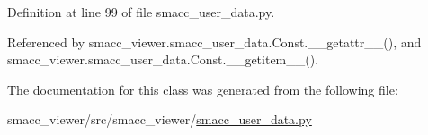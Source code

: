 Definition at line 99 of file smacc\+\_\+user\+\_\+data.\+py.



Referenced by smacc\+\_\+viewer.\+smacc\+\_\+user\+\_\+data.\+Const.\+\_\+\+\_\+getattr\+\_\+\+\_\+(), and smacc\+\_\+viewer.\+smacc\+\_\+user\+\_\+data.\+Const.\+\_\+\+\_\+getitem\+\_\+\+\_\+().



The documentation for this class was generated from the following file\+:\begin{DoxyCompactItemize}
\item 
smacc\+\_\+viewer/src/smacc\+\_\+viewer/\hyperlink{smacc__user__data_8py}{smacc\+\_\+user\+\_\+data.\+py}\end{DoxyCompactItemize}
